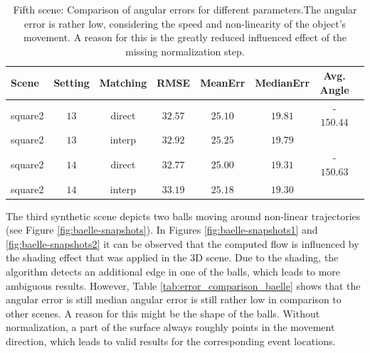 \begin{table}[tb]
	\centering
		\begin{tabular}{lccccccc}
Scene & Setting & Matching & RMSE & MeanErr & MedianErr & Avg. Angle \\
\hline  \hline
square2 & $13$ & direct & $32.57$ & $25.10$ & $19.81$ & -$150.44$ & \\
square2 & $13$ & interp & $32.92$ & $25.25$ & $19.79$ &  & \\
square2 & $14$ & direct & $32.77$ & $25.00$ & $19.31$ & -$150.63$ & \\
square2 & $14$ & interp & $33.19$ & $25.18$ & $19.30$ &  & \\
		\end{tabular}
	\caption[Fifth scene: Comparison of angular errors for different parameters.]{Fifth scene: Comparison of angular errors for different parameters.The angular error is rather low, considering the speed and non-linearity of the object's movement.
	A reason for this is the greatly reduced influenced effect of the missing normalization step.}
	\label{tab:error_comparison_square2}
\end{table}


The third synthetic scene depicts two balls moving around non-linear trajectories (see Figure \ref{fig:baelle-snapshots}). 
In Figures \ref{fig:baelle-snapshots1} and \ref{fig:baelle-snapshots2} it can be observed that the computed flow is influenced by the shading effect that was applied in the 3D scene. 
Due to the shading, the algorithm detects an additional edge in one of the balls, which leads to more ambiguous results.
However, Table \ref{tab:error_comparison_baelle} shows that the angular error is still median angular error is still rather low in comparison to other scenes.
A reason for this might be the shape of the balls. 
Without normalization, a part of the surface always roughly points in the movement direction, which leads to valid results for the corresponding event locations.

